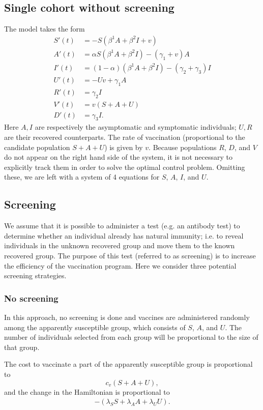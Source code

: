\documentclass[english,12pt,letter]{article}
\begin{document}
\subsection{Single cohort without screening}
The model takes the form
\begin{align}
    S'(t) & = -S(\beta^1 A + \beta^2 I + v) \\
    {A}'(t) & = \alpha S (\beta^1 A + \beta^2 I) - (\gamma_1 + v) A \\
    {I}'(t) & = (1-\alpha) (\beta^1 A + \beta^2 I) - (\gamma_2 + \gamma_3) I \\
    {U}'(t) & = -U v + \gamma_1 A \\
    {R}'(t) & = \gamma_2 I \\
    V'(t) & = v(S + A + U) \\
    D'(t) & = \gamma_3 I.
\end{align}
Here $A, I$ are respectively the asymptomatic and symptomatic individuals;
$U, R$ are their recovered counterparts.  The rate of vaccination (proportional
to the candidate population $S+A+U$) is given by $v$.
Because populations $R$, $D$, and $V$ do not appear on the right hand side of the
system, it is not necessary to explicitly track them in order to solve the optimal control problem.
Omitting these, we are left with a system of 4 equations for $S$, $A$, $I$, and $U$.


\subsection{Screening}
We assume that it is possible to administer a test (e.g. an antibody test) to determine
whether an individual already has natural immunity; i.e. to reveal individuals in the
unknown recovered group and move them to the known recovered group.  The purpose of
this test (referred to as screening) is to increase the efficiency of the vaccination
program.  Here we consider three potential screening strategies.

\subsubsection{No screening}
In this approach, no screening is done and vaccines are administered randomly
among the apparently susceptible group, which consists of $S$, $A$, and $U$.
The number of individuals selected from each group will be proportional
to the size of that group.

The cost to vaccinate a part of the apparently susceptible group is proportional to
$$
c_v (S + A + U),
$$
and the change in the Hamiltonian is proportional to
\begin{align} \label{delta-H}
    - (\lambda_S S + \lambda_{A} A + \lambda_{U} U).
\end{align}
\end{document}

